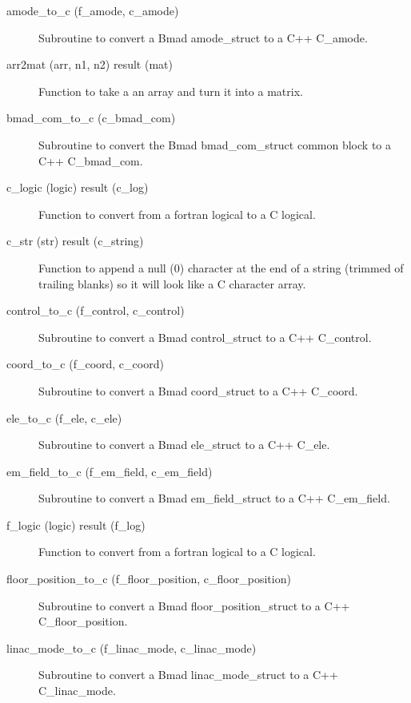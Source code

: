 \begin{description}

\item[amode\_to\_c (f\_amode, c\_amode)] \Newline 
Subroutine to convert a Bmad amode\_struct to a C++ C\_amode.

\item[arr2mat (arr, n1, n2) result (mat)] \Newline 
Function to take a an array and turn it into a matrix.

\item[bmad\_com\_to\_c (c\_bmad\_com)] \Newline 
Subroutine to convert the Bmad bmad\_com\_struct common block to 
a C++ C\_bmad\_com.

\item[c\_logic (logic) result (c\_log)] \Newline 
Function to convert from a fortran logical to a C logical.

\item[c\_str (str) result (c\_string)] \Newline 
Function to append a null (0) character at the end of a string (trimmed
of trailing blanks) so it will look like a C character array. 

\item[control\_to\_c (f\_control, c\_control)] \Newline 
Subroutine to convert a Bmad control\_struct to a C++ C\_control.

\item[coord\_to\_c (f\_coord, c\_coord)] \Newline 
Subroutine to convert a Bmad coord\_struct to a C++ C\_coord.

\item[ele\_to\_c (f\_ele, c\_ele)] \Newline 
Subroutine to convert a Bmad ele\_struct to a C++ C\_ele.

\item[em\_field\_to\_c (f\_em\_field, c\_em\_field)] \Newline 
Subroutine to convert a Bmad em\_field\_struct to a C++ C\_em\_field.

\item[f\_logic (logic) result (f\_log)] \Newline 
Function to convert from a fortran logical to a C logical.

\item[floor\_position\_to\_c (f\_floor\_position, c\_floor\_position)] \Newline 
Subroutine to convert a Bmad floor\_position\_struct to a C++ C\_floor\_position.

\item[linac\_mode\_to\_c (f\_linac\_mode, c\_linac\_mode)] \Newline 
Subroutine to convert a Bmad linac\_mode\_struct to a C++ C\_linac\_mode.


\end{description}

